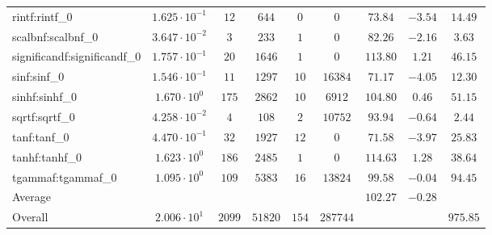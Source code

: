 \begin{tabular}{|l|c|c|c|c|c|c|c|c|}
rintf:rintf\_0               & $ 1.625 \cdot 10^{-1} $ & $ 12     $ & $ 644   $ & $ 0   $ & $ 0      $ & $ 73.84       $ & $ -3.54   $ & $ 14.49   $ \\
scalbnf:scalbnf\_0           & $ 3.647 \cdot 10^{-2} $ & $ 3      $ & $ 233   $ & $ 1   $ & $ 0      $ & $ 82.26       $ & $ -2.16   $ & $ 3.63    $ \\
significandf:significandf\_0 & $ 1.757 \cdot 10^{-1} $ & $ 20     $ & $ 1646  $ & $ 1   $ & $ 0      $ & $ 113.80      $ & $ 1.21    $ & $ 46.15   $ \\
sinf:sinf\_0                 & $ 1.546 \cdot 10^{-1} $ & $ 11     $ & $ 1297  $ & $ 10  $ & $ 16384  $ & $ 71.17       $ & $ -4.05   $ & $ 12.30   $ \\
sinhf:sinhf\_0               & $ 1.670 \cdot 10^{0}  $ & $ 175    $ & $ 2862  $ & $ 10  $ & $ 6912   $ & $ 104.80      $ & $ 0.46    $ & $ 51.15   $ \\
sqrtf:sqrtf\_0               & $ 4.258 \cdot 10^{-2} $ & $ 4      $ & $ 108   $ & $ 2   $ & $ 10752  $ & $ 93.94       $ & $ -0.64   $ & $ 2.44    $ \\
tanf:tanf\_0                 & $ 4.470 \cdot 10^{-1} $ & $ 32     $ & $ 1927  $ & $ 12  $ & $ 0      $ & $ 71.58       $ & $ -3.97   $ & $ 25.83   $ \\
tanhf:tanhf\_0               & $ 1.623 \cdot 10^{0}  $ & $ 186    $ & $ 2485  $ & $ 1   $ & $ 0      $ & $ 114.63      $ & $ 1.28    $ & $ 38.64   $ \\
tgammaf:tgammaf\_0           & $ 1.095 \cdot 10^{0}  $ & $ 109    $ & $ 5383  $ & $ 16  $ & $ 13824  $ & $ 99.58       $ & $ -0.04   $ & $ 94.45   $ \\
\hline
Average                      & $                     $ & $        $ & $       $ & $     $ & $        $ & $ 102.27      $ & $ -0.28   $ & $         $ \\
\hline
Overall                      & $ 2.006 \cdot 10^{1}  $ & $ 2099   $ & $ 51820 $ & $ 154 $ & $ 287744 $ & $             $ & $         $ & $ 975.85  $ \\
\hline
\end{tabular}
